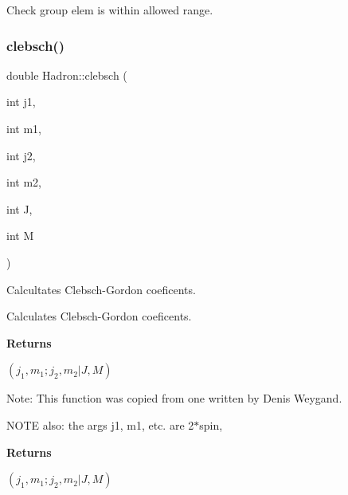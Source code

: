 Check group elem is within allowed range. 

\mbox{\label{namespaceHadron_ac4cba1d4aa3863fdc7991c208b3b9594}} 
\subsubsection{\texorpdfstring{clebsch()}{clebsch()}}
{\footnotesize\ttfamily double Hadron\+::clebsch (\begin{DoxyParamCaption}\item[{int}]{j1,  }\item[{int}]{m1,  }\item[{int}]{j2,  }\item[{int}]{m2,  }\item[{int}]{J,  }\item[{int}]{M }\end{DoxyParamCaption})}



Calcultates Clebsch-\/\+Gordon coeficents. 

Calculates Clebsch-\/\+Gordon coeficents.

{\bfseries{ Returns }}

$\left(j_1,m_1;j_2,m_2|J,M\right) $

Note\+: This function was copied from one written by Denis Weygand.

N\+O\+TE also\+: the args j1, m1, etc. are 2$\ast$spin,

{\bfseries{ Returns }}

$\left(j_1,m_1;j_2,m_2|J,M\right) $

